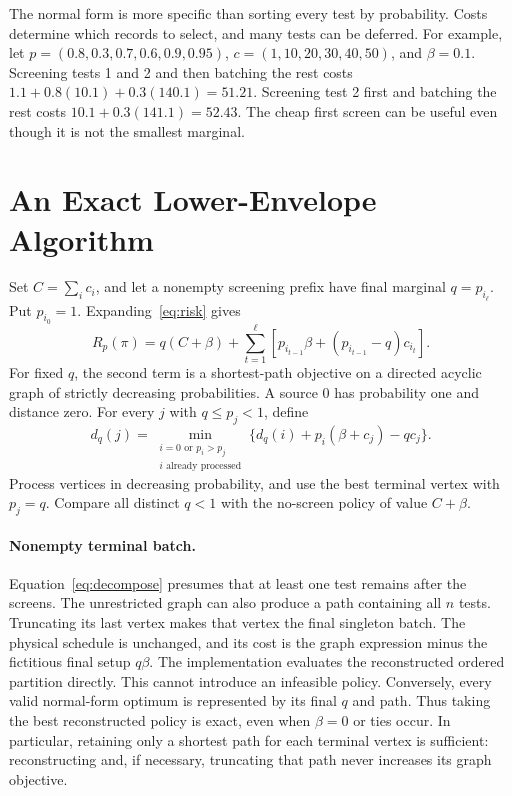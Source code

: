 \documentclass[runningheads]{llncs}
\begin{document}
The normal form is more specific than sorting every test by probability.
Costs determine which records to select, and many tests can be deferred.
For example, let
$p=(0.8,0.3,0.7,0.6,0.9,0.95)$,
$c=(1,10,20,30,40,50)$, and $\beta=0.1$.
Screening tests 1 and 2 and then batching the rest costs
$1.1+0.8(10.1)+0.3(140.1)=51.21$.
Screening test 2 first and batching the rest costs
$10.1+0.3(141.1)=52.43$.
The cheap first screen can be useful even though it is not the smallest
marginal.

\section{An Exact Lower-Envelope Algorithm}
Set $C=\sum_i c_i$, and let a nonempty screening prefix have final marginal
$q=p_{i_\ell}$. Put $p_{i_0}=1$. Expanding~\eqref{eq:risk} gives
\begin{equation}
R_p(\pi)=q(C+\beta)+
\sum_{t=1}^{\ell}
 \left[p_{i_{t-1}}\beta+(p_{i_{t-1}}-q)c_{i_t}\right].
\label{eq:decompose}
\end{equation}
For fixed $q$, the second term is a shortest-path objective on a directed
acyclic graph of strictly decreasing probabilities. A source $0$ has
probability one and distance zero. For every $j$ with $q\leq p_j<1$, define
\begin{equation}
d_q(j)=\min_{\substack{i=0\text{ or }p_i>p_j\\i\text{ already processed}}}
 \{d_q(i)+p_i(\beta+c_j)-qc_j\}.
\label{eq:dag}
\end{equation}
Process vertices in decreasing probability, and use the best terminal vertex
with $p_j=q$. Compare all distinct $q<1$ with the no-screen policy of value
$C+\beta$.

\paragraph{Nonempty terminal batch.}
Equation~\eqref{eq:decompose} presumes that at least one test remains after
the screens. The unrestricted graph can also produce a path containing all
$n$ tests. Truncating its last vertex makes that vertex the final singleton
batch. The physical schedule is unchanged, and its cost is the graph
expression minus the fictitious final setup $q\beta$. The implementation
evaluates the reconstructed ordered partition directly. This cannot introduce
an infeasible policy. Conversely, every valid normal-form optimum is represented
by its final $q$ and path. Thus taking the best reconstructed policy is exact,
even when $\beta=0$ or ties occur. In particular, retaining only a shortest
path for each terminal vertex is sufficient: reconstructing and, if necessary,
truncating that path never increases its graph objective.
\end{document}
